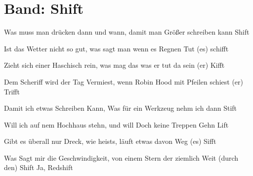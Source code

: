 \newpage
\section{Band: Shift}
\label{sec:band_shift}
\charaktere{\Chor \Sing}

\begin{verseplay}[5em]
\s{\Sing}Was muss man drücken dann und wann, damit man Größer schreiben kann
\s{\Chor} Shift 
\end{verseplay}
\begin{verseplay}[5em]
\s{\Sing}Ist das Wetter nicht so gut, was sagt man wenn es Regnen Tut
(es)
\s{\Chor} schifft
\end{verseplay}
\begin{verseplay}[5em]
\s{\Sing}Zieht sich einer Haschisch rein, was mag das was er tut da sein
(er)
\s{\Chor} Kifft 
\end{verseplay}
\begin{verseplay}[5em]
\s{\Sing}Dem Scheriff wird der Tag Vermiest, wenn Robin Hood mit Pfeilen schiest
(er)
\s{\Chor} Trifft

\end{verseplay}
\begin{verseplay}[5em]
\s{\Sing}Damit ich etwas Schreiben Kann, Was für ein Werkzeug nehm ich dann
\s{\Chor} Stift
\end{verseplay}
\begin{verseplay}[5em]
\s{\Sing}Will ich auf nem Hochhaus stehn, und will Doch keine Treppen Gehn
\s{\Chor} Lift
\end{verseplay}
\begin{verseplay}[5em]
\s{\Sing}Gibt es überall nur Dreck, wie heists, läuft etwas davon Weg
(es)
\s{\Chor} Sifft
\end{verseplay}
\begin{verseplay}[5em]
\s{\Sing}Was Sagt mir die Geschwindigkeit, von einem Stern der ziemlich Weit 
(durch den)
\s{\Chor} Shift
\s{\Sing}Ja, Redshift

\end{verseplay}


